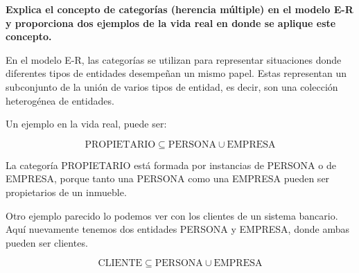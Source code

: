 \item \textbf{Explica el concepto de categorías (herencia múltiple) en el modelo E-R y proporciona dos ejemplos de la vida real en donde se aplique este concepto.}

En el modelo E-R, las categorías se utilizan para representar situaciones donde diferentes tipos de entidades desempeñan un mismo papel. Estas representan un subconjunto de la unión de varios tipos de entidad, es decir, son una colección heterogénea de entidades.

Un ejemplo en la vida real, puede ser:

\begin{equation*}
    \text{PROPIETARIO} \subseteq \text{PERSONA} \cup \text{EMPRESA}
\end{equation*}

La categoría PROPIETARIO está formada por instancias de PERSONA o de EMPRESA, porque tanto una PERSONA como una EMPRESA pueden ser propietarios de un inmueble.

Otro ejemplo parecido lo podemos ver con los clientes de un sistema bancario. Aquí nuevamente tenemos dos entidades PERSONA y EMPRESA, donde ambas pueden ser clientes.

\begin{equation*}
    \text{CLIENTE} \subseteq \text{PERSONA} \cup \text{EMPRESA}
\end{equation*}
